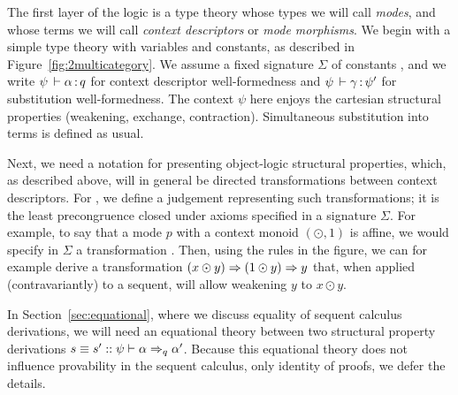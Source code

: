 The first layer of the logic is a type theory whose types we will call
\emph{modes}, and whose terms we will call \emph{context descriptors} or
\emph{mode morphisms}.  We begin with a simple type theory with
variables and constants, as described in
Figure~\ref{fig:2multicategory}.  We assume a fixed signature $\Sigma$
of constants , and we write $\oftp{\psi}{\alpha}{q}$ for context
descriptor well-formedness and $\oftp{\psi}{\gamma}{\psi'}$ for
substitution well-formedness.  The context $\psi$ here enjoys the
cartesian structural properties (weakening, exchange, contraction).
Simultaneous substitution into terms is defined as usual.

Next, we need a notation for presenting object-logic structural
properties, which, as described above, will in general be directed
transformations between context descriptors.  For
, we define a judgement
     {} representing such
     transformations; it is the least precongruence closed under axioms
     specified in a signature $\Sigma$.  For example, to say that a mode
     $p$ with a context monoid $(\odot,1)$ is affine, we would specify
     in $\Sigma$ a transformation .  Then, using the
     rules in the figure, we can for example derive a transformation $(x
     \odot y) \spr (1 \odot y) \spr y$ that, when applied
     (contravariantly) to a sequent, will allow weakening $y$ to $x
     \odot y$.

In Section~\ref{sec:equational}, where we discuss equality of sequent
calculus derivations, we will need an equational theory between two
structural property derivations $s \deq s' ::
\wfsp{\psi}{\alpha}{\alpha'}{q}$.  Because this equational theory does
not influence provability in the sequent calculus, only identity of
proofs, we defer the details.

